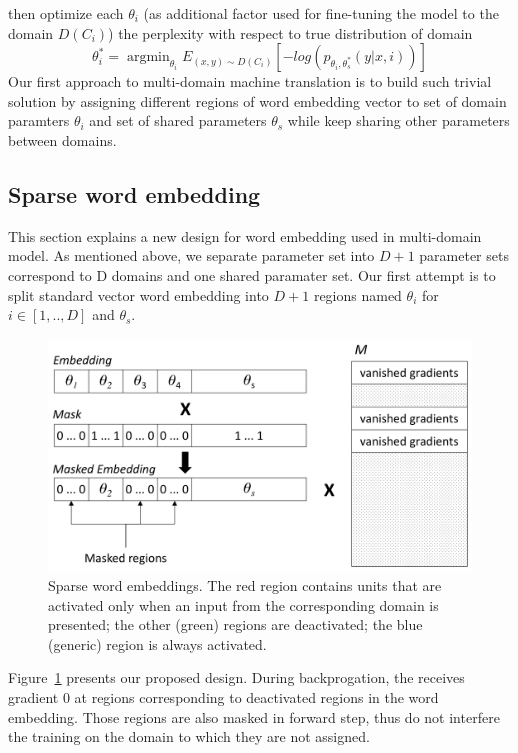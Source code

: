 \documentclass[11pt,a4paper]{article}
\DeclareMathOperator*{\argmin}{argmin}
\newcommand{\fyTodo}[1]{\Todo[FY:]{\textcolor{orange}{#1}}}
\begin{document}
then optimize each $\theta_i$ (as additional factor used for fine-tuning the model to the domain $D(C_{i})$) the perplexity with respect to true distribution of domain
\begin{equation}
\theta^*_{i} = \displaystyle{\mathop{\argmin}_{\theta_i}}E_{(x,y) \sim D(C_{i})}[-log(p_{\theta_i,\theta^*_s}(y|x,i))]
\end{equation} 
Our first approach to multi-domain machine translation is to build such trivial solution by assigning different regions of word embedding vector to set of domain paramters $\theta_i$ and set of shared parameters $\theta_s$ while keep sharing other parameters between domains.
\subsection{Sparse word embedding}
\label{sec:sparse}
This section explains a new design for word embedding used in multi-domain model. As mentioned above, we separate parameter set into $D+1$ parameter sets correspond to D domains and one shared paramater set. Our first attempt is to split standard vector word embedding into $D+1$ regions named $\theta_i$ for $i \in [1,..,D]$ and $\theta_s$.
\begin{figure}
\center
    \includegraphics[width=0.5\linewidth]{embeddings}
    \caption{Sparse word embeddings. The red region contains units that are activated only when an input from the corresponding domain is presented; the other (green) regions are deactivated; the blue (generic) region is always activated.} 
    \label{fig:network}
  \end{figure}
\fyTodo{Explain vanishing ?}
Figure~\ref{fig:network} presents our proposed design. During backprogation, the \fyTodo{fix notation}{projection matrix $M$} receives gradient 0 at regions corresponding to deactivated regions in the word embedding. Those regions are also masked in forward step, thus do not interfere the training on the domain to which they are not assigned.
\end{document}
